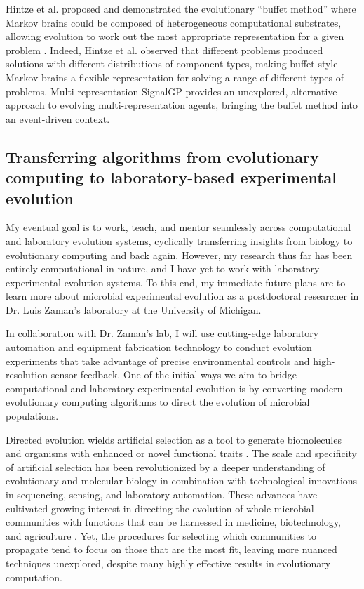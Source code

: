 Hintze et al. proposed and demonstrated the evolutionary ``buffet method'' where Markov brains could be composed of heterogeneous computational substrates, allowing evolution to work out the most appropriate representation for a given problem \citep{hintze_buffet_2019}. 
Indeed, Hintze et al. observed that different problems produced solutions with different distributions of component types, making buffet-style Markov brains a flexible representation for solving a range of different types of problems. 
Multi-representation SignalGP provides an unexplored, alternative approach to evolving multi-representation agents, bringing the buffet method into an event-driven context.

\subsection{Transferring algorithms from evolutionary computing to laboratory-based experimental evolution}

My eventual goal is to work, teach, and mentor seamlessly across computational and laboratory evolution systems, cyclically transferring insights from biology to evolutionary computing and back again.
However, my research thus far has been entirely computational in nature, and I have yet to work with laboratory experimental evolution systems.
To this end, my immediate future plans are to learn more about microbial experimental evolution as a postdoctoral researcher in Dr. Luis Zaman's laboratory at the University of Michigan.

In collaboration with Dr. Zaman's lab, I will use cutting-edge laboratory automation and equipment fabrication technology to conduct evolution experiments that take advantage of precise environmental controls and high-resolution sensor feedback.
One of the initial ways we aim to bridge computational and laboratory experimental evolution is by converting modern evolutionary computing algorithms to direct the evolution of microbial populations. 

Directed evolution wields artificial selection as a tool to generate biomolecules and organisms with enhanced or novel functional traits \citep{chen_tuning_1993,sanchez_directed_2021}. 
The scale and specificity of artificial selection has been revolutionized by a deeper understanding of evolutionary and molecular biology in combination with technological innovations in sequencing, sensing, and laboratory automation.
These advances have cultivated growing interest in directing the evolution of whole microbial communities with functions that can be harnessed in medicine, biotechnology, and agriculture \citep{sanchez_directed_2021}. 
Yet, the procedures for selecting which communities to propagate tend to focus on those that are the most fit, leaving more nuanced techniques unexplored, despite many highly effective results in evolutionary computation.

